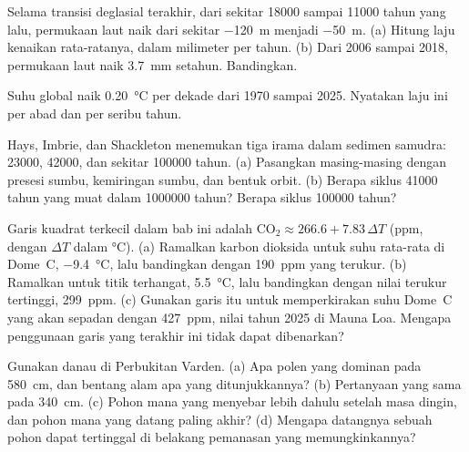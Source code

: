 \begin{exercise}[$\star$]\label{exo:g12:past-climates:3}
Selama transisi deglasial terakhir, dari sekitar \num{18000} sampai
\num{11000} tahun yang lalu, permukaan laut naik dari sekitar \qty{-120}{m}
menjadi \qty{-50}{m}. (a) Hitung laju kenaikan rata-ratanya, dalam milimeter
per tahun. (b) Dari 2006 sampai 2018, permukaan laut naik \qty{3.7}{mm}
setahun. Bandingkan.
\end{exercise}

\begin{exercise}[$\star$]\label{exo:g12:past-climates:4}
Suhu global naik \qty{0.20}{\degreeCelsius} per dekade dari 1970 sampai 2025.
Nyatakan laju ini per abad dan per seribu tahun.
\end{exercise}

\begin{exercise}[$\star$]\label{exo:g12:past-climates:5}
Hays, Imbrie, dan Shackleton menemukan tiga irama dalam sedimen samudra:
\num{23000}, \num{42000}, dan sekitar \num{100000} tahun. (a) Pasangkan
masing-masing dengan presesi sumbu, kemiringan sumbu, dan bentuk orbit.
(b) Berapa siklus \num{41000} tahun yang muat dalam \num{1000000} tahun? Berapa
siklus \num{100000} tahun?
\end{exercise}

\begin{exercise}[$\star\star$]\label{exo:g12:past-climates:6}
Garis kuadrat terkecil dalam bab ini adalah $\mathrm{CO_2} \approx 266.6 +
7.83\,\Delta T$ (ppm, dengan $\Delta T$ dalam \unit{\degreeCelsius}).
(a) Ramalkan karbon dioksida untuk suhu rata-rata  di
Dome~C, \qty{-9.4}{\degreeCelsius}, lalu bandingkan dengan \qty{190}{ppm} yang
terukur. (b) Ramalkan untuk titik terhangat, \qty{+5.5}{\degreeCelsius}, lalu
bandingkan dengan nilai terukur tertinggi, \qty{299}{ppm}. (c) Gunakan garis itu
untuk memperkirakan suhu Dome~C yang akan sepadan dengan \qty{427}{ppm}, nilai
tahun 2025 di Mauna Loa. Mengapa penggunaan garis yang terakhir ini tidak
dapat dibenarkan?
\end{exercise}

\begin{exercise}[$\star\star$]\label{exo:g12:past-climates:7}
Gunakan  danau di Perbukitan Varden. (a) Apa polen yang dominan
pada \qty{580}{cm}, dan bentang alam apa yang ditunjukkannya? (b) Pertanyaan
yang sama pada \qty{340}{cm}. (c) Pohon mana yang menyebar lebih dahulu setelah
masa dingin, dan pohon mana yang datang paling akhir? (d) Mengapa datangnya
sebuah pohon dapat tertinggal di belakang pemanasan yang memungkinkannya?
\end{exercise}

